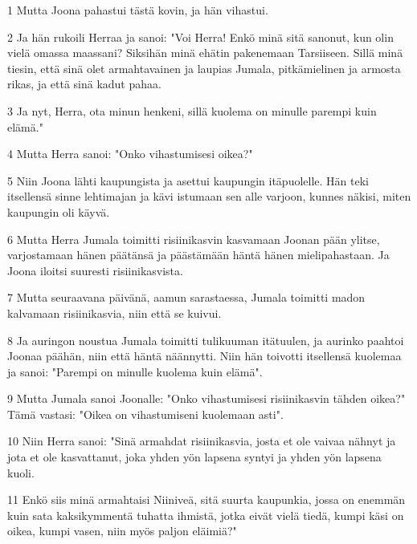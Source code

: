 \par 1 Mutta Joona pahastui tästä kovin, ja hän vihastui.
\par 2 Ja hän rukoili Herraa ja sanoi: "Voi Herra! Enkö minä sitä sanonut, kun olin vielä omassa maassani? Siksihän minä ehätin pakenemaan Tarsiiseen. Sillä minä tiesin, että sinä olet armahtavainen ja laupias Jumala, pitkämielinen ja armosta rikas, ja että sinä kadut pahaa.
\par 3 Ja nyt, Herra, ota minun henkeni, sillä kuolema on minulle parempi kuin elämä."
\par 4 Mutta Herra sanoi: "Onko vihastumisesi oikea?"
\par 5 Niin Joona lähti kaupungista ja asettui kaupungin itäpuolelle. Hän teki itsellensä sinne lehtimajan ja kävi istumaan sen alle varjoon, kunnes näkisi, miten kaupungin oli käyvä.
\par 6 Mutta Herra Jumala toimitti risiinikasvin kasvamaan Joonan pään ylitse, varjostamaan hänen päätänsä ja päästämään häntä hänen mielipahastaan. Ja Joona iloitsi suuresti risiinikasvista.
\par 7 Mutta seuraavana päivänä, aamun sarastaessa, Jumala toimitti madon kalvamaan risiinikasvia, niin että se kuivui.
\par 8 Ja auringon noustua Jumala toimitti tulikuuman itätuulen, ja aurinko paahtoi Joonaa päähän, niin että häntä näännytti. Niin hän toivotti itsellensä kuolemaa ja sanoi: "Parempi on minulle kuolema kuin elämä".
\par 9 Mutta Jumala sanoi Joonalle: "Onko vihastumisesi risiinikasvin tähden oikea?" Tämä vastasi: "Oikea on vihastumiseni kuolemaan asti".
\par 10 Niin Herra sanoi: "Sinä armahdat risiinikasvia, josta et ole vaivaa nähnyt ja jota et ole kasvattanut, joka yhden yön lapsena syntyi ja yhden yön lapsena kuoli.
\par 11 Enkö siis minä armahtaisi Niiniveä, sitä suurta kaupunkia, jossa on enemmän kuin sata kaksikymmentä tuhatta ihmistä, jotka eivät vielä tiedä, kumpi käsi on oikea, kumpi vasen, niin myös paljon eläimiä?"


